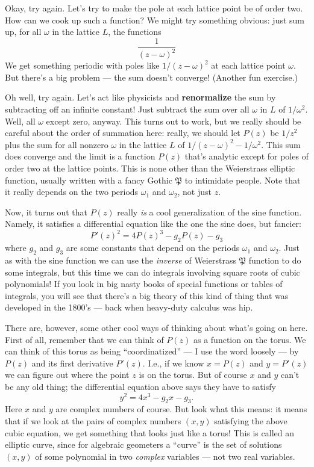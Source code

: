 \documentclass{article}
\begin{document}
Okay, try again. Let's try to make the pole at each lattice point be of
order two. How can we cook up such a function? We might try something
obvious: just sum up, for all \(\omega\) in the lattice \(L\), the
functions \[\frac{1}{(z -\omega)^2}\] We get something periodic with
poles like \(1/(z -\omega)^2\) at each lattice point \(\omega\). But
there's a big problem --- the sum doesn't converge! (Another fun
exercise.)

Oh well, try again. Let's act like physicists and \textbf{renormalize}
the sum by subtracting off an infinite constant! Just subtract the sum
over all \(\omega\) in \(L\) of \(1/\omega^2\). Well, all \(\omega\)
except zero, anyway. This turns out to work, but we really should be
careful about the order of summation here: really, we should let
\(P(z)\) be \(1/z^2\) plus the sum for all nonzero \(\omega\) in the
lattice \(L\) of \(1/(z -\omega)^2 -1/\omega^2\). This sum does converge
and the limit is a function \(P(z)\) that's analytic except for poles of
order two at the lattice points. This is none other than the Weierstrass
elliptic function, usually written with a fancy Gothic \(\mathfrak{P}\)
to intimidate people. Note that it really depends on the two periods
\(\omega_1\) and \(\omega_2\), not just \(z\).

Now, it turns out that \(P(z)\) really \emph{is} a cool generalization
of the sine function. Namely, it satisfies a differential equation like
the one the sine does, but fancier:
\[P'(z)^2 = 4 P(z)^3 - g_2 P(z) - g_3\] 
where \(g_2\) and \(g_3\)
are some constants that depend on the periods \(\omega_1\) and
\(\omega_2\). Just as with the sine function we can use the
\emph{inverse} of Weierstrass \(\mathfrak{P}\) function to do some
integrals, but this time we can do integrals involving square roots of
cubic polynomials! If you look in big nasty books of special functions
or tables of integrals, you will see that there's a big theory of this
kind of thing that was developed in the 1800's --- back when heavy-duty
calculus was hip.

There are, however, some other cool ways of thinking about what's going
on here. First of all, remember that we can think of \(P(z)\) as a
function on the torus. We can think of this torus as being
``coordinatized'' --- I use the word loosely --- by \(P(z)\) and its
first derivative \(P'(z)\). I.e., if we know \(x = P(z)\) and
\(y = P'(z)\) we can figure out where the point \(z\) is on the torus.
But of course \(x\) and \(y\) can't be any old thing; the differential
equation above says they have to satisfy \[y^2 = 4x^3 -g_2 x -g_3.\]
Here \(x\) and \(y\) are complex numbers of course. But look what this
means: it means that if we look at the pairs of complex numbers
\((x,y)\) satisfying the above cubic equation, we get something that
looks just like a torus! This is called an elliptic curve, since for
algebraic geometers a ``curve'' is the set of solutions \((x,y)\) of
some polynomial in two \emph{complex} variables --- not two real
variables.
\end{document}
